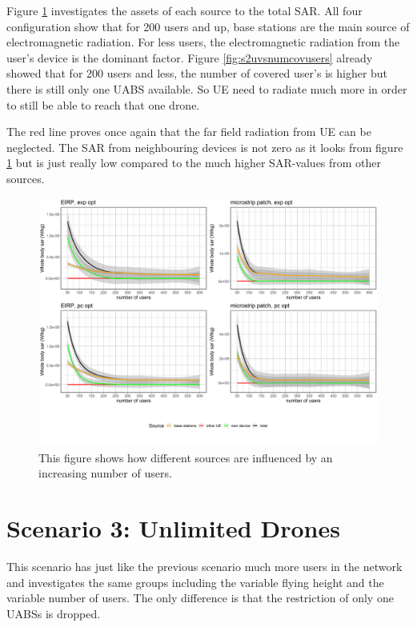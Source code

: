 Figure \ref{fig:s2fourSourcesMatrix} investigates the assets of each source to the total \gls{SAR}. All four 
configuration show that for 200 users and up, base stations are the main source of electromagnetic radiation.
For less users, the electromagnetic radiation from the user's device is the dominant factor. Figure \ref{fig:s2uvsnumcovusers} already 
showed that for 200 users and less, the number of covered user's is higher  but there is still only one \gls{UABS} available.
So \gls{UE}  need to radiate much more in order to still be able to reach that one drone.

The red line proves once again that the far field radiation from \gls{UE} can be neglected. The \gls{SAR} from 
neighbouring devices is not zero as it looks from figure \ref{fig:s2fourSourcesMatrix} but is just really low compared to the much higher
\gls{SAR}-values from other sources.

\begin{figure}[h!]
  \includegraphics[width=\textwidth]{../results/s2/uFourSources.png}
  \caption{This figure shows how different sources are influenced by an increasing number of users. }
  \label{fig:s2fourSourcesMatrix}
\end{figure}

\section{Scenario 3: Unlimited Drones}
\label{s3}

This scenario has just like the previous scenario much more users in the network 
and investigates the same groups including the variable flying height and the variable number of  users.
The only difference is that the restriction of only one \gls{UABS}s is dropped.

